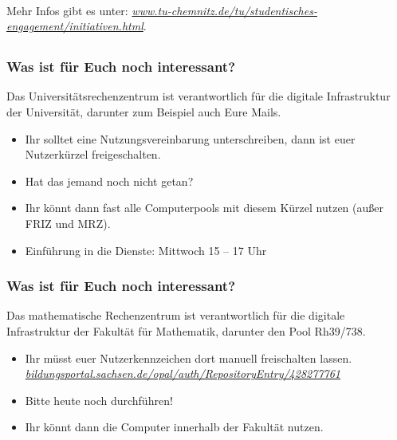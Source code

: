 \documentclass[10pt]{beamer}
\begin{document}
\begin{frame}
\begin{picture}
\end{picture} \\
\vspace*{3.8cm}
Mehr Infos gibt es unter: \textit{\href{https://www.tu-chemnitz.de/tu/studentisches-engagement/initiativen.html}{www.tu-chemnitz.de/tu/studentisches-engagement/initiativen.html}}.
\end{frame}

\subsection*{ }
\begin{frame}
\frametitle{Was ist für Euch noch interessant?}
\begin{block}{\vphantom{X}}
	Das Universitätsrechenzentrum ist verantwortlich für die digitale Infrastruktur der Universität, darunter zum Beispiel auch Eure Mails.
\end{block}
\begin{itemize}
	\item Ihr solltet eine Nutzungsvereinbarung unterschreiben, dann ist euer Nutzerkürzel freigeschalten.
	\item Hat das jemand noch nicht getan?
	\item Ihr könnt dann fast alle Computerpools mit diesem Kürzel nutzen (außer FRIZ und MRZ).
	\item Einführung in die Dienste: Mittwoch 15 -- 17 Uhr
\end{itemize}
\end{frame}

\begin{frame}
\frametitle{Was ist für Euch noch interessant?}
\begin{block}{\vphantom{X}}
	Das mathematische Rechenzentrum ist verantwortlich für die digitale Infrastruktur der Fakultät für Mathematik, darunter den Pool Rh39/738.
\end{block}
\begin{itemize}
	\item Ihr müsst euer Nutzerkennzeichen dort manuell freischalten lassen. \textit{\href{https://bildungsportal.sachsen.de/opal/auth/RepositoryEntry/428277761}{bildungsportal.sachsen.de/opal/auth/RepositoryEntry/428277761}}
	\item Bitte heute noch durchführen!
	\item Ihr könnt dann die Computer innerhalb der Fakultät nutzen.
\end{itemize}
\end{frame}
\end{document}
